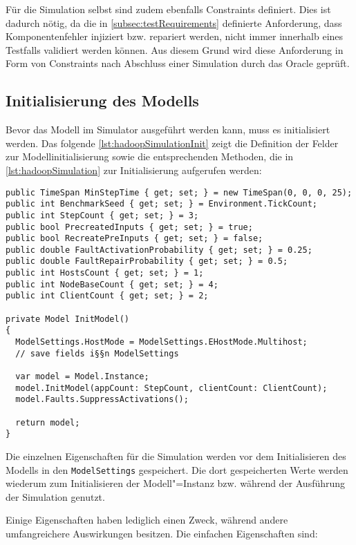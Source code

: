 Für die Simulation selbst sind zudem ebenfalls Constraints definiert.
Dies ist dadurch nötig, da die in \cref{subsec:testRequirements} definierte Anforderung, dass Komponentenfehler injiziert bzw. repariert werden, nicht immer innerhalb eines Testfalls validiert werden können.
Aus diesem Grund wird diese Anforderung in Form von Constraints nach Abschluss einer Simulation durch das Oracle geprüft.

\subsection{Initialisierung des Modells}
\label{subsec:simulationModelInit}

Bevor das Modell im Simulator ausgeführt werden kann, muss es initialisiert werden.
Das folgende \cref{lst:hadoopSimulationInit} zeigt die Definition der Felder zur Modellinitialisierung sowie die entsprechenden Methoden, die in \cref{lst:hadoopSimulation} zur Initialisierung aufgerufen werden:

\begin{lstlisting}[label=lst:hadoopSimulationInit,style=cs,
caption={Initialisierung des Modells für die Simulation}]
public TimeSpan MinStepTime { get; set; } = new TimeSpan(0, 0, 0, 25);
public int BenchmarkSeed { get; set; } = Environment.TickCount;
public int StepCount { get; set; } = 3;
public bool PrecreatedInputs { get; set; } = true;
public bool RecreatePreInputs { get; set; } = false;
public double FaultActivationProbability { get; set; } = 0.25;
public double FaultRepairProbability { get; set; } = 0.5;
public int HostsCount { get; set; } = 1;
public int NodeBaseCount { get; set; } = 4;
public int ClientCount { get; set; } = 2;

private Model InitModel()
{
  ModelSettings.HostMode = ModelSettings.EHostMode.Multihost;
  // save fields i§§n ModelSettings
  
  var model = Model.Instance;
  model.InitModel(appCount: StepCount, clientCount: ClientCount);
  model.Faults.SuppressActivations();
  
  return model;
}
\end{lstlisting}

Die einzelnen Eigenschaften für die Simulation werden vor dem Initialisieren des Modells in den \texttt{ModelSettings} gespeichert.
Die dort gespeicherten Werte werden wiederum zum Initialisieren der Modell"=Instanz bzw. während der Ausführung der Simulation genutzt.

Einige Eigenschaften haben lediglich einen Zweck, während andere umfangreichere Auswirkungen besitzen.
Die einfachen Eigenschaften sind:

